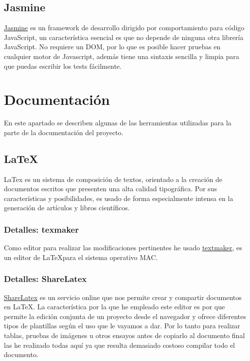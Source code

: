 \subsection{Jasmine}\label{jasmine}
\href{https://jasmine.github.io/}{Jasmine} es un framework de desarrollo dirigido por comportamiento para código JavaScript, un característica esencial es que no depende de ninguna otra librería JavaScript. No requiere un DOM, por lo que es posible hacer pruebas en cualquier motor de Javascript, además tiene una sintaxis sencilla y limpia para que puedas escribir los tests fácilmente.

\section{Documentación}\label{docs}
En este apartado se describen algunas de las herramientas utilizadas para la parte de la documentación del proyecto.

 \subsection{La\TeX}\label{docs_latex}
  LaTex es un sistema de composición de textos, orientado a la creación de documentos escritos que presenten una alta calidad tipográfica. Por sus características y posibilidades, es usado de forma especialmente intensa en la generación de artículos y libros científicos. 
   \subsubsection{Detalles: texmaker}
   
   Como editor para realizar las modificaciones pertinentes he usado \href{http://www.xm1math.net/texmaker/}{textmaker}, es un editor de La\TeX para el sistema operativo MAC. 
  
   \subsubsection{Detalles: ShareLatex}
    \href{https://es.sharelatex.com/}{ShareLatex}  es un servicio online que nos permite crear y compartir documentos en La\TeX. La característica por la que he empleado este editor es por que  permite la edición conjunta de un proyecto desde el navegador y ofrece diferentes tipos de plantillas según el uso que le vayamos a dar. Por lo tanto para realizar tablas, pruebas de imágenes u otros ensayos antes de copiarlo al documento final las he realizado todas aquí ya que resulta demasiado costoso compilar todo el documento.
  
